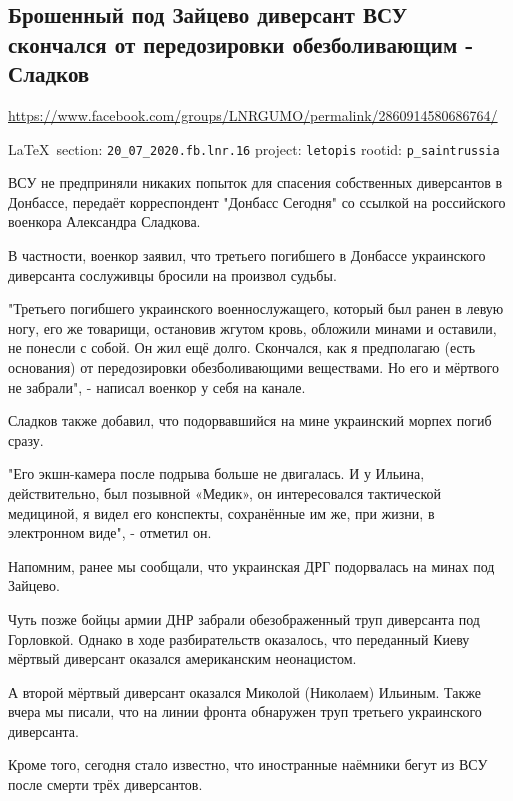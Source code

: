  
 

\subsection{Брошенный под Зайцево диверсант ВСУ скончался от передозировки обезболивающим - Сладков}
\label{sec:20_07_2020.fb.lnr.16}
\url{https://www.facebook.com/groups/LNRGUMO/permalink/2860914580686764/}
  
\vspace{0.5cm}
{\small\LaTeX~section: \verb|20_07_2020.fb.lnr.16| project: \verb|letopis| rootid: \verb|p_saintrussia|}
\vspace{0.5cm}

ВСУ не предприняли никаких попыток для спасения собственных диверсантов в
Донбассе, передаёт корреспондент "Донбасс Сегодня" со ссылкой на российского
военкора Александра Сладкова.

В частности, военкор заявил, что третьего погибшего в Донбассе украинского
диверсанта сослуживцы бросили на произвол судьбы.

"Третьего погибшего украинского военнослужащего, который был ранен в левую
ногу, его же товарищи, остановив жгутом кровь, обложили минами и оставили, не
понесли с собой. Он жил ещё долго.  Скончался, как я предполагаю (есть
основания) от передозировки обезболивающими веществами. Но его и мёртвого не
забрали", - написал военкор у себя на канале.

Сладков также добавил, что подорвавшийся на мине украинский морпех погиб сразу.

"Его экшн-камера после подрыва больше не двигалась.  И у Ильина, действительно,
был позывной «Медик», он интересовался тактической медициной, я видел его
конспекты, сохранённые им же, при жизни, в электронном виде", - отметил он.

Напомним, ранее мы сообщали, что украинская ДРГ подорвалась на минах под
Зайцево.

Чуть позже бойцы армии ДНР забрали обезображенный труп диверсанта под
Горловкой. Однако в ходе разбирательств оказалось, что переданный Киеву мёртвый
диверсант оказался американским неонацистом.

А второй мёртвый диверсант оказался Миколой (Николаем) Ильиным.  Также вчера мы
писали, что на линии фронта обнаружен труп третьего украинского диверсанта.

Кроме того, сегодня стало известно, что иностранные наёмники бегут из ВСУ после
смерти трёх диверсантов. 
